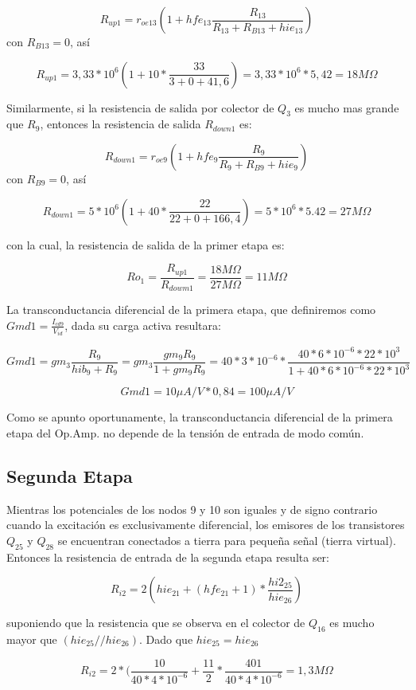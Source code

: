\documentclass[12pt,a4paper,final,headinclude,footinclude,BCOR5mm]{scrartcl}
\begin{document}
$$R_{up1} = r_{oe13} (1 + hfe_{13} \frac{R_{13}}{R_{13} + R_{B13} + hie_{13}})$$ con $R_{B13} = 0$, así

$$R_{up1} = 3,33*10^{6} (1 + 10 * \frac{33}{3+0+41,6}) = 3,33*10^{6}*5,42 = 18 M\Omega$$

Similarmente, si la resistencia de salida por colector de $Q_{3}$ es mucho mas grande que $R_{9}$, entonces la resistencia de salida $R_{down1}$ es:

$$R_{down1} = r_{oe9} (1 + hfe_{9} \frac{R_{9}}{R_{9} + R_{B9} + hie_{9}})$$ con $R_{B9} = 0$, así

$$R_{down1} = 5*10^{6} (1 + 40 * \frac{22}{22+0+166,4}) = 5*10^{6}*5.42 = 27 M\Omega$$

con la cual, la resistencia de salida de la primer etapa es:

$$Ro_{1} = \frac{R_{up1}}{R_{dowm1}} = \frac{18 M\Omega}{27 M\Omega} = 11 M\Omega$$

La transconductancia diferencial de la primera etapa, que definiremos como  $Gmd1 = \frac{I_{cd9}}{V_{id}}$, dada su carga activa resultara:

$$Gmd1 = gm_{3} \frac{R_{9}}{hib_{9}+R_{9}} = gm_{3} \frac{gm_{9}R_{9}}{1 + gm_{9}R_{9}} = 40*3*10^{-6}*\frac{40*6*10^{-6}*22*10^{3}}{1+40*6*10^{-6}*22*10^{3}} $$

$$Gmd1 = 10 \mu A/V * 0,84 = 100 \mu A/V$$

Como se apunto oportunamente, la transconductancia diferencial de la primera etapa del Op.Amp. no depende de la tensión de entrada de modo común. 

\subsection{Segunda Etapa}

Mientras los potenciales de los nodos 9 y 10 son iguales y de signo contrario cuando la excitación es exclusivamente diferencial,  los emisores de los transistores $Q_{25}$ y $Q_{28}$ se encuentran conectados a tierra para pequeña señal (tierra virtual). Entonces la resistencia de entrada de la segunda etapa resulta ser:

$$R_{i2} = 2 (hie_{21}+(hfe_{21}+1)*\frac{hi2_{25}}{hie_{26}})$$

suponiendo que la resistencia que se observa en el colector de $Q_{16}$ es mucho mayor que $(hie_{25} // hie_{26})$. Dado que $hie_{25} = hie_{26}$

$$R_{i2} = 2*( \frac{10}{40*4*10^{-6}}+\frac{11}{2}*\frac{401}{40*4*10^{-6}} = 1,3 M\Omega$$
\end{document}
